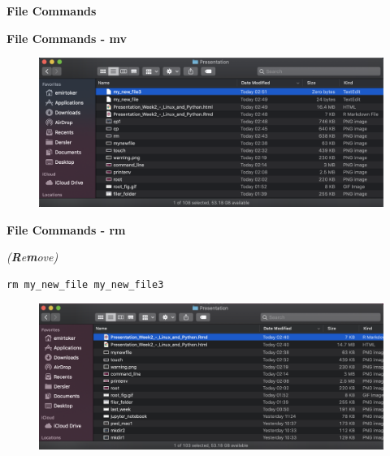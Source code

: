 \documentclass[ignorenonframetext,]{beamer}
\begin{document}
\begin{frame}[fragile]{\textbf{File Commands}}
\begin{block}{\textbf{File Commands - {\textbf{mv}}}}
\begin{figure}
\centering
\includegraphics{mv.png}
\caption{}
\end{figure}

\end{block}

\begin{block}{\textbf{File Commands - {\textbf{rm}}}}

\emph{(\textbf{R}e\textbf{m}ove)}

\begin{verbatim}
rm my_new_file my_new_file3
\end{verbatim}

\begin{figure}
\centering
\includegraphics{rm.png}
\caption{}
\end{figure}

\end{block}

\end{frame}
\end{document}
